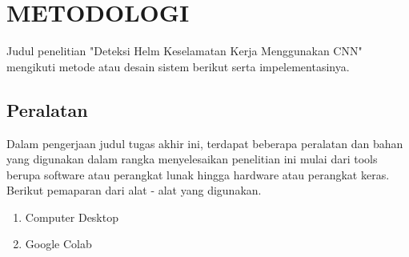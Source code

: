 \chapter{METODOLOGI}
\label{chap:metodologi}


Judul penelitian "Deteksi Helm Keselamatan Kerja Menggunakan CNN" mengikuti metode atau desain sistem berikut serta impelementasinya.


\section{Peralatan}
\label{sec:peralatan}

Dalam pengerjaan judul tugas akhir ini, terdapat beberapa peralatan dan bahan yang digunakan dalam rangka menyelesaikan penelitian ini mulai dari tools berupa software atau perangkat lunak hingga hardware atau perangkat keras. Berikut pemaparan dari alat - alat yang digunakan.

\begin{enumerate}[nolistsep]
  \item Computer Desktop 
  \item Google Colab
\end{enumerate}


